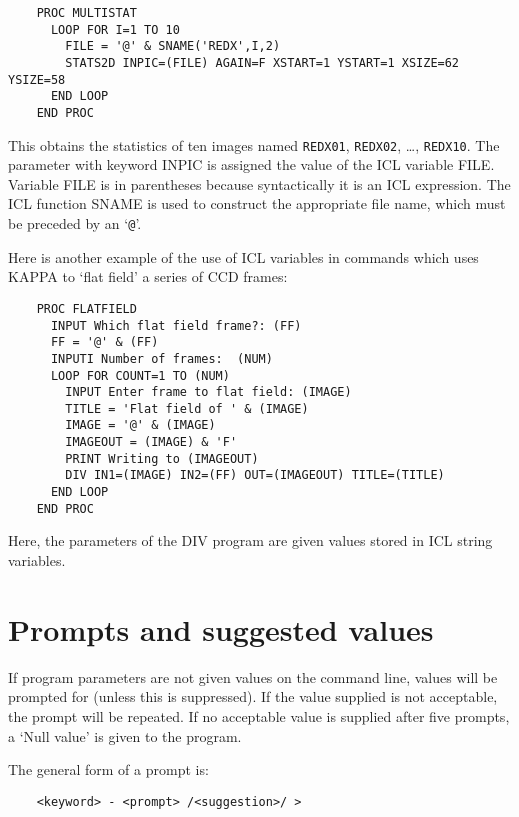 \begin{small}
\begin{verbatim}
    PROC MULTISTAT
      LOOP FOR I=1 TO 10
        FILE = '@' & SNAME('REDX',I,2)
        STATS2D INPIC=(FILE) AGAIN=F XSTART=1 YSTART=1 XSIZE=62 YSIZE=58
      END LOOP
    END PROC
\end{verbatim}
\end{small}

This obtains the statistics of ten images named {\small\tt REDX01},
{\small\tt REDX02}, \dots, {\small\tt REDX10}.
The parameter with keyword INPIC is assigned the value of the ICL variable FILE.
Variable FILE is in parentheses because syntactically it is an ICL expression.
The ICL function SNAME is used to construct the appropriate file name, which must
be preceded by an `{\tt @}'.

Here is another example of the use of ICL variables in commands which uses KAPPA
to `flat field' a series of CCD frames:

\begin{small}
\begin{verbatim}
    PROC FLATFIELD
      INPUT Which flat field frame?: (FF)
      FF = '@' & (FF)
      INPUTI Number of frames:  (NUM)
      LOOP FOR COUNT=1 TO (NUM)
        INPUT Enter frame to flat field: (IMAGE)
        TITLE = 'Flat field of ' & (IMAGE)
        IMAGE = '@' & (IMAGE)
        IMAGEOUT = (IMAGE) & 'F'
        PRINT Writing to (IMAGEOUT) 
        DIV IN1=(IMAGE) IN2=(FF) OUT=(IMAGEOUT) TITLE=(TITLE)
      END LOOP
    END PROC
\end{verbatim}
\end{small}

Here, the parameters of the DIV program are given values stored in ICL string
variables.

\section{Prompts and suggested values}
\label{S_pd}

If program parameters are not given values on the command line, values
will be prompted for (unless this is suppressed).
If the value supplied is not acceptable, the prompt will be repeated.
If no acceptable value is supplied after five prompts, a `Null value'
is given to the program.

The general form of a prompt is:

\begin{small}
\begin{verbatim}
    <keyword> - <prompt> /<suggestion>/ >
\end{verbatim}
\end{small}

